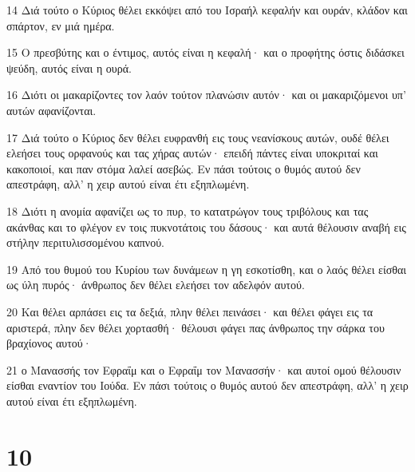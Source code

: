 \par 14 Διά τούτο ο Κύριος θέλει εκκόψει από του Ισραήλ κεφαλήν και ουράν, κλάδον και σπάρτον, εν μιά ημέρα.
\par 15 Ο πρεσβύτης και ο έντιμος, αυτός είναι η κεφαλή· και ο προφήτης όστις διδάσκει ψεύδη, αυτός είναι η ουρά.
\par 16 Διότι οι μακαρίζοντες τον λαόν τούτον πλανώσιν αυτόν· και οι μακαριζόμενοι υπ' αυτών αφανίζονται.
\par 17 Διά τούτο ο Κύριος δεν θέλει ευφρανθή εις τους νεανίσκους αυτών, ουδέ θέλει ελεήσει τους ορφανούς και τας χήρας αυτών· επειδή πάντες είναι υποκριταί και κακοποιοί, και παν στόμα λαλεί ασεβώς. Εν πάσι τούτοις ο θυμός αυτού δεν απεστράφη, αλλ' η χειρ αυτού είναι έτι εξηπλωμένη.
\par 18 Διότι η ανομία αφανίζει ως το πυρ, το κατατρώγον τους τριβόλους και τας ακάνθας και το φλέγον εν τοις πυκνοτάτοις του δάσους· και αυτά θέλουσιν αναβή εις στήλην περιτυλισσομένου καπνού.
\par 19 Από του θυμού του Κυρίου των δυνάμεων η γη εσκοτίσθη, και ο λαός θέλει είσθαι ως ύλη πυρός· άνθρωπος δεν θέλει ελεήσει τον αδελφόν αυτού.
\par 20 Και θέλει αρπάσει εις τα δεξιά, πλην θέλει πεινάσει· και θέλει φάγει εις τα αριστερά, πλην δεν θέλει χορτασθή· θέλουσι φάγει πας άνθρωπος την σάρκα του βραχίονος αυτού·
\par 21 ο Μανασσής τον Εφραΐμ και ο Εφραΐμ τον Μανασσήν· και αυτοί ομού θέλουσιν είσθαι εναντίον του Ιούδα. Εν πάσι τούτοις ο θυμός αυτού δεν απεστράφη, αλλ' η χειρ αυτού είναι έτι εξηπλωμένη.

\chapter{10}

